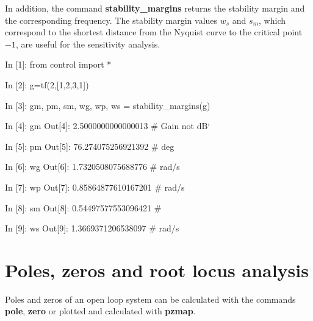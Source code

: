 In addition, the command \textbf{stability\_margins} returns the stability 
margin and the corresponding frequency. The stability margin values $w_s$ and 
$s_m$, which correspond to the shortest distance from the Nyquist curve to the 
critical point $-1$, are useful for the sensitivity analysis. 

\begin{code}
In [1]: from control import *

In [2]: g=tf(2,[1,2,3,1])

In [3]: gm, pm, sm, wg, wp, ws = stability_margins(g)

In [4]: gm
Out[4]: 2.5000000000000013	# Gain not dB`

In [5]: pm
Out[5]: 76.274075256921392	# deg

In [6]: wg
Out[6]: 1.7320508075688776	# rad/s

In [7]: wp
Out[7]: 0.85864877610167201	# rad/s

In [8]: sm
Out[8]: 0.54497577553096421	#

In [9]: ws
Out[9]: 1.3669371206538097	# rad/s
\end{code}

\section{Poles, zeros and root locus analysis}
Poles and zeros of an open loop system can be calculated with the 
commands \textbf{pole}, \textbf{zero} or plotted and calculated with 
\textbf{pzmap}.

